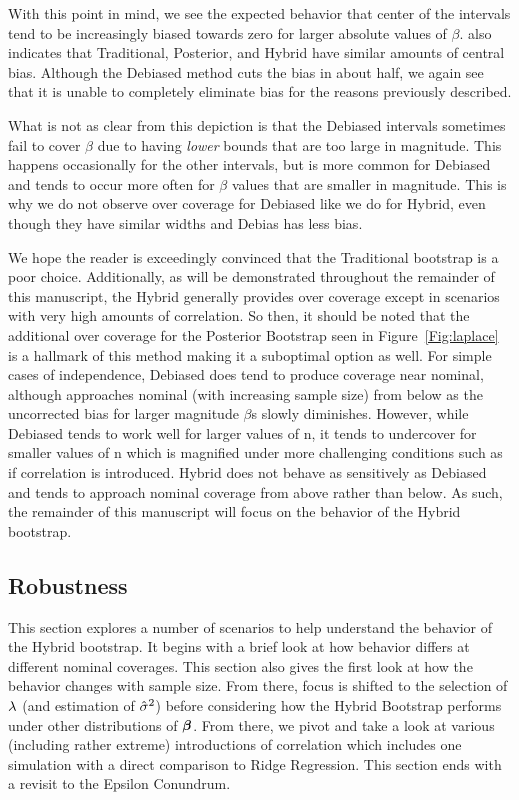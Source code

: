 With this point in mind, we see the expected behavior that center of the intervals tend to be increasingly biased towards zero for larger absolute values of $\beta$.  also indicates that Traditional, Posterior, and Hybrid have similar amounts of central bias. Although the Debiased method cuts the bias in about half, we again see that it is unable to completely eliminate bias for the reasons previously described.

What is not as clear from this depiction is that the Debiased intervals sometimes fail to cover $\beta$ due to having \textit{lower} bounds that are too large in magnitude. This happens occasionally for the other intervals, but is more common for Debiased and tends to occur more often for $\beta$ values that are smaller in magnitude. This is why we do not observe over coverage for Debiased like we do for Hybrid, even though they have similar widths and Debias has less bias. 

We hope the reader is exceedingly convinced that the Traditional bootstrap is a poor choice. Additionally, as will be demonstrated throughout the remainder of this manuscript, the Hybrid generally provides over coverage except in scenarios with very high amounts of correlation.  So then, it should be noted that the additional over coverage for the Posterior Bootstrap seen in Figure~\ref{Fig:laplace} is a hallmark of this method making it a suboptimal option as well. For simple cases of independence, Debiased does tend to produce coverage near nominal, although approaches nominal (with increasing sample size) from below as the uncorrected bias for larger magnitude $\beta$s slowly diminishes. However, while Debiased tends to work well for larger values of n, it tends to undercover for smaller values of n which is magnified under more challenging conditions such as if correlation is introduced. Hybrid does not behave as sensitively as Debiased and tends to approach nominal coverage from above rather than below. As such, the remainder of this manuscript will focus on the behavior of the Hybrid bootstrap.

\subsection{Robustness}

This section explores a number of scenarios to help understand the behavior of the Hybrid bootstrap. It begins with a brief look at how behavior differs at different nominal coverages. This section also gives the first look at how the behavior changes with sample size. From there, focus is shifted to the selection of $\lambda$ (and estimation of $\hat{\sigma}^2$) before considering how the Hybrid Bootstrap performs under other distributions of $\boldsymbol{\beta}$. From there, we pivot and take a look at various (including rather extreme) introductions of correlation which includes one simulation with a direct comparison to Ridge Regression. This section ends with a revisit to the Epsilon Conundrum.


